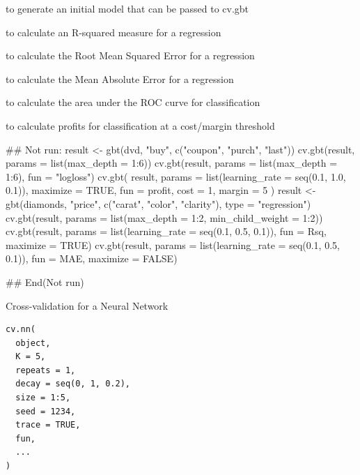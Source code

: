 \documentclass[a4paper]{book}
\begin{document}
%
\begin{SeeAlso}
 to generate an initial model that can be passed to cv.gbt

 to calculate an R-squared measure for a regression

 to calculate the Root Mean Squared Error for a regression

 to calculate the Mean Absolute Error for a regression

 to calculate the area under the ROC curve for classification

 to calculate profits for classification at a cost/margin threshold
\end{SeeAlso}
%
\begin{Examples}
\begin{ExampleCode}
## Not run: 
result <- gbt(dvd, "buy", c("coupon", "purch", "last"))
cv.gbt(result, params = list(max_depth = 1:6))
cv.gbt(result, params = list(max_depth = 1:6), fun = "logloss")
cv.gbt(
  result,
  params = list(learning_rate = seq(0.1, 1.0, 0.1)),
  maximize = TRUE, fun = profit, cost = 1, margin = 5
)
result <- gbt(diamonds, "price", c("carat", "color", "clarity"), type = "regression")
cv.gbt(result, params = list(max_depth = 1:2, min_child_weight = 1:2))
cv.gbt(result, params = list(learning_rate = seq(0.1, 0.5, 0.1)), fun = Rsq, maximize = TRUE)
cv.gbt(result, params = list(learning_rate = seq(0.1, 0.5, 0.1)), fun = MAE, maximize = FALSE)

## End(Not run)

\end{ExampleCode}
\end{Examples}
%
\begin{Description}
Cross-validation for a Neural Network
\end{Description}
%
\begin{Usage}
\begin{verbatim}
cv.nn(
  object,
  K = 5,
  repeats = 1,
  decay = seq(0, 1, 0.2),
  size = 1:5,
  seed = 1234,
  trace = TRUE,
  fun,
  ...
)
\end{verbatim}
\end{Usage}
%
\end{document}
